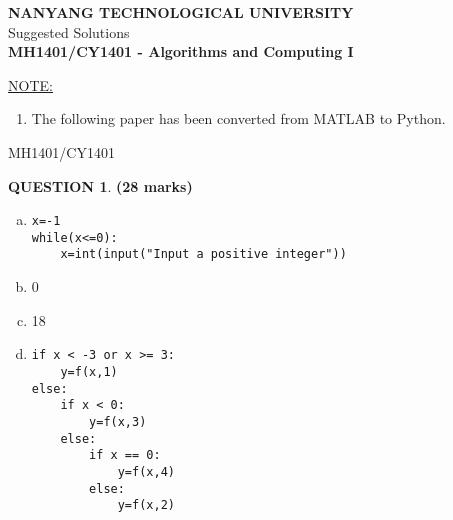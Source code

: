 \documentclass[a4paper,12pt]{article}
\theoremstyle{definition}
\newtheorem{ques}[dummy]{QUESTION}
\theoremstyle{plain}
\newcommand{\py}{python}
\begin{document}
	\begin{titlepage}
		\begin{center}
			\textbf{NANYANG TECHNOLOGICAL UNIVERSITY}\\\vspace{1em}Suggested Solutions\\\vspace{1em}
			\textbf{MH1401/CY1401 - Algorithms and Computing I}
		\end{center}
				\vspace{5em}
	\underline{NOTE:}
	\begin{enumerate}
		\item The following paper has been converted from MATLAB to Python.
	\end{enumerate}
	\vfill
	\end{titlepage}


	\tableofcontents
	\newpage
\hfill MH1401/CY1401\vspace*{0.5em}
\begin{ques}\hfill\textbf{(28 marks)}\\
	\begin{enumerate}[(a)]
		\item 
		\begin{verbatim}
x=-1
while(x<=0):
    x=int(input("Input a positive integer"))
		\end{verbatim}
		\item 0
		\item 18
		\item 
\begin{verbatim}
if x < -3 or x >= 3:
    y=f(x,1)
else:
    if x < 0:
        y=f(x,3)
    else:
        if x == 0:
            y=f(x,4)
        else:
            y=f(x,2)
\end{verbatim}
	\end{enumerate}
\end{ques}
\end{document}
